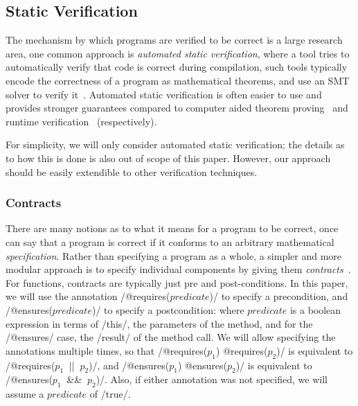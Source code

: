 \subsection{Static Verification}
The mechanism by which programs are verified to be correct is a large research area, one common approach is \emph{automated static verification}, where a tool tries to automatically verify that code is correct during compilation, such tools typically encode the correctness of a program as mathematical theorems, and use an SMT solver to verify it~\cite{DBLP:conf/fmco/BarnettCDJL05}. Automated static verification is often easier to use and provides stronger guarantees compared to computer aided theorem proving~\cite{Zee:2009:IPL:1542476.1542514} and runtime verification~\cite{Strickland:2012:CIR:2384616.2384685} (respectively). 

For simplicity, we will only consider automated static verification; the details as to how this is done is also out of scope of this paper. However, our approach should be easily extendible to other verification techniques.

\subsubsection{Contracts}
There are many notions as to what it means for a program to be correct, once can say that a program is correct if it conforms to an arbitrary mathematical \emph{specification}. Rather than specifying a program as a whole, a simpler and more modular approach is to specify individual components by giving them \emph{contracts}~\cite{Meyer:1988:OSC:534929}. For functions, contracts are typically just pre and post-conditions. In this paper, we will use the annotation /@requires($predicate$)/ to specify a precondition, and /@ensures($predicate$)/ to specify a postcondition: where $predicate$ is a boolean expression in terms of /this/, the parameters of the method, and for the /@ensures/ case, the /result/ of the method call. We will allow specifying the annotations multiple times, so that /@requires($p_1$) @requires($p_2$)/ is equivalent to /@requires($p_1\ $ || $\ p_2$)/, and /@ensures($p_1$) @ensures($p_2$)/ is equivalent to /@ensures($p_1\ $ && $\ p_2$)/. Also, if either annotation was not specified, we will assume a $predicate$ of /true/. 


